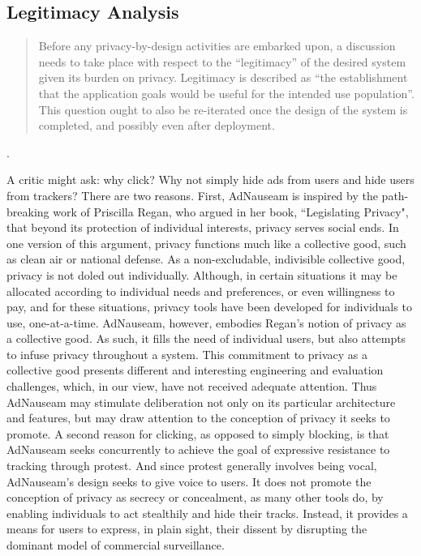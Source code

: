 \documentclass[conference]{IEEEtran}
\begin{document}
\subsection{Legitimacy Analysis}

\blockquote{Before any privacy-by-design activities are embarked upon, a discussion needs to take place with respect to the ``legitimacy'' of the desired system given its burden on privacy. Legitimacy is described as ``the establishment that the application goals would be useful for the intended use population''. This question ought to also be re-iterated once the design of the system is completed, and possibly even after deployment.}\cite{Iachello}.

A critic might ask: why click? Why not simply hide ads from users and hide users from trackers? There are two reasons. First, AdNauseam is inspired by the path-breaking work of Priscilla Regan, who argued in her book, ``Legislating Privacy", that beyond its protection of individual interests, privacy serves social ends\cite{Regan}. In one version of this argument, privacy functions much like a collective good, such as clean air or national defense. As a non-excludable, indivisible collective good, privacy is not doled out individually. Although, in certain situations it may be allocated according to individual needs and preferences, or even willingness to pay, and for these situations, privacy tools have been developed for individuals to use, one-at-a-time. AdNauseam, however, embodies Regan’s notion of privacy as a collective good. As such, it fills the need of individual users, but also attempts to infuse privacy throughout a system. This commitment to privacy as a collective good presents different and interesting engineering and evaluation challenges, which, in our view, have not received adequate attention. Thus AdNauseam may stimulate deliberation not only on its particular architecture and features, but may draw attention to the conception of privacy it seeks to promote. A second reason for clicking, as opposed to simply blocking, is that AdNauseam seeks concurrently to achieve the goal of expressive resistance to tracking through protest. And since protest generally involves being vocal, AdNauseam's design seeks to give voice to users. It does not promote the conception of privacy as secrecy or concealment, as many other tools do, by enabling individuals to act stealthily and hide their tracks. Instead, it provides a means for users to express, in plain sight, their dissent by disrupting the dominant model of commercial surveillance.
\end{document}
